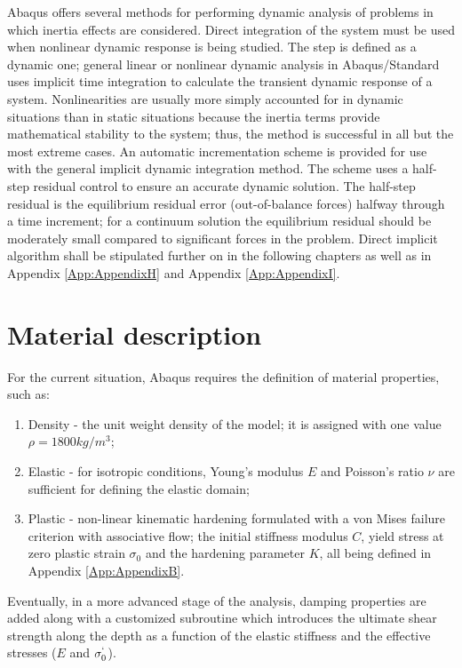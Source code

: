\documentclass[12pt,a4paper]{report}
\begin{document}
Abaqus offers several methods for performing dynamic analysis of problems in which inertia effects are considered. Direct integration of the system must be used when nonlinear dynamic response is being studied. The step is defined as a dynamic one; general linear or nonlinear dynamic analysis in Abaqus/Standard uses implicit time integration to calculate the transient dynamic response of a system. Nonlinearities are usually more simply accounted for in dynamic situations than in static situations because the inertia terms provide mathematical stability to the system; thus, the method is successful in all but the most extreme cases. An automatic incrementation scheme is provided for use with the general implicit dynamic integration method. The scheme uses a half-step residual control to ensure an accurate dynamic solution. The half-step residual is the equilibrium residual error (out-of-balance forces) halfway through a time increment; for a continuum solution the equilibrium residual should be moderately small compared to significant forces in the problem.
Direct implicit algorithm shall be stipulated further on in the following chapters as well as in Appendix \ref{App:AppendixH} and Appendix \ref{App:AppendixI}.
\newpage
\section{Material description}
For the current situation, Abaqus requires the definition of material properties, such as:
\begin{enumerate}
	\item Density - the unit weight density of the model; it is assigned with one value $\rho = 1800 kg/m^3$;
	\item Elastic - for isotropic conditions, Young's modulus $E$ and Poisson's ratio $\nu$ are sufficient for defining the elastic domain;
	\item Plastic - non-linear kinematic hardening formulated with a von Mises failure criterion with associative flow; the initial stiffness modulus $C$, yield stress at zero plastic strain $\sigma_0$ and the hardening parameter $K$, all being defined in Appendix \ref{App:AppendixB}.
\end{enumerate}

	Eventually, in a more advanced stage of the analysis, damping properties are added along with a customized subroutine which introduces the ultimate shear strength along the depth as a function of the elastic stiffness and the effective stresses ($E$ and $\sigma^`_0$).
\end{document}
